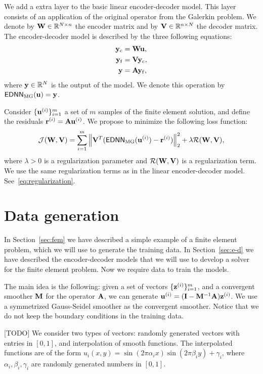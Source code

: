 We add a extra layer to the basic linear encoder-decoder model.
This layer consists of an application of the original operator from the Galerkin problem.
We denote by \(\mathbf{W} \in \mathbb{R}^{N \times n}\) the encoder matrix and by \(\mathbf{V} \in \mathbb{R}^{n \times N}\) the decoder matrix.
The encoder-decoder model is described by the three following equations:
\begin{subequations}
    \begin{align}
        \mathbf{y}_\mathrm{c} & = \mathbf{W} \mathbf{u}, \\
        \mathbf{y}_\mathrm{f} & = \mathbf{V} \mathbf{y}_\mathrm{c}, \\
        \mathbf{y} & = \mathbf{A} \mathbf{y}_\mathrm{f},
    \end{align}
\end{subequations}
where \(\mathbf{y} \in \mathbb{R}^{N}\) is the output of the model.
We denote this operation by \(\mathsf{EDNN}_\mathrm{MG}(\mathbf{u}) = \mathbf{y}\).

Consider \( \{ \mathbf{u}^{(i)} \}_{i=1}^{m} \) a set of \(m\) samples of the finite element solution, and define the residuals \(\mathbf{r}^{(i)} = \mathbf{A} \mathbf{u}^{(i)}\).
We propose to minimize the following loss function:
\begin{equation}
    \mathcal{J}(\mathbf{W}, \mathbf{V}) =
    \sum_{i=1}^{m} \left\lVert \mathbf{V}^T( \mathsf{EDNN}_\mathrm{MG}(\mathbf{u}^{(i)}) - \mathbf{r}^{(i)} )  \right\rVert_2^2 +
    \lambda \mathcal{R}(\mathbf{W}, \mathbf{V}),
\end{equation}
where \(\lambda > 0\) is a regularization parameter and \(\mathcal{R}(\mathbf{W}, \mathbf{V})\) is a regularization term.
We use the same regularization terms as in the linear encoder-decoder model.
See~\eqref{eq:regularization}.

\section{Data generation}
\label{sec:data}

In Section~\ref{sec:fem} we have described a simple example of a finite element problem, which we will use to generate the training data.
In Section~\ref{sec:e-d} we have described the encoder-decoder models that we will use to develop a solver for the finite element problem.
Now we require data to train the models.

The main idea is the following: given a set of vectors \( \{ \mathbf{z}^{(i)} \}_{i=1}^{m} \), and a convergent smoother \( \mathbf{M}\) for the operator \(\mathbf{A}\), we can generate \( \mathbf{u}^{(i)} = (\mathbf{I} - \mathbf{M}^{-1} \mathbf{A}) \mathbf{z}^{(i)} \).
We use a symmetrized Gauss-Seidel smoother as the convergent smoother.
Notice that we do not keep the boundary conditions in the training data.

[TODO]
We consider two types of vectors: randomly generated vectors with entries in \([0,1]\),
and interpolation of smooth functions.
The interpolated functions are of the form \(u_i(x,y) = \sin(2 \pi \alpha_i x) \sin(2 \pi \beta_i y) + \gamma_i\), where \(\alpha_i, \beta_i, \gamma_i\) are randomly generated numbers in \([0,1]\).

